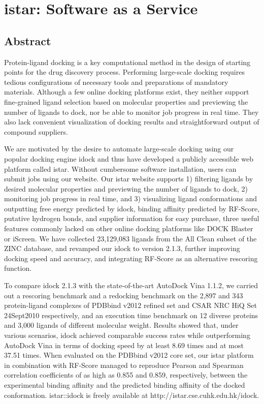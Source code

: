 \chapter{istar: Software as a Service}

\section{Abstract}

Protein-ligand docking is a key computational method in the design of starting points for the drug discovery process. Performing large-scale docking requires tedious configurations of necessary tools and preparations of mandatory materials. Although a few online docking platforms exist, they neither support fine-grained ligand selection based on molecular properties and previewing the number of ligands to dock, nor be able to monitor job progress in real time. They also lack convenient visualization of docking results and straightforward output of compound suppliers.

We are motivated by the desire to automate large-scale docking using our popular docking engine idock and thus have developed a publicly accessible web platform called istar. Without cumbersome software installation, users can submit jobs using our website. Our istar website supports 1) filtering ligands by desired molecular properties and previewing the number of ligands to dock, 2) monitoring job progress in real time, and 3) visualizing ligand conformations and outputting free energy predicted by idock, binding affinity predicted by RF-Score, putative hydrogen bonds, and supplier information for easy purchase, three useful features commonly lacked on other online docking platforms like DOCK Blaster or iScreen. We have collected 23,129,083 ligands from the All Clean subset of the ZINC database, and revamped our idock to version 2.1.3, further improving docking speed and accuracy, and integrating RF-Score as an alternative rescoring function.

To compare idock 2.1.3 with the state-of-the-art AutoDock Vina 1.1.2, we carried out a rescoring benchmark and a redocking benchmark on the 2,897 and 343 protein-ligand complexes of PDBbind v2012 refined set and CSAR NRC HiQ Set 24Sept2010 respectively, and an execution time benchmark on 12 diverse proteins and 3,000 ligands of different molecular weight. Results showed that, under various scenarios, idock achieved comparable success rates while outperforming AutoDock Vina in terms of docking speed by at least 8.69 times and at most 37.51 times. When evaluated on the PDBbind v2012 core set, our istar platform in combination with RF-Score managed to reproduce Pearson and Spearman correlation coefficients of as high as 0.855 and 0.859, respectively, between the experimental binding affinity and the predicted binding affinity of the docked conformation. istar::idock is freely available at http://istar.cse.cuhk.edu.hk/idock.

